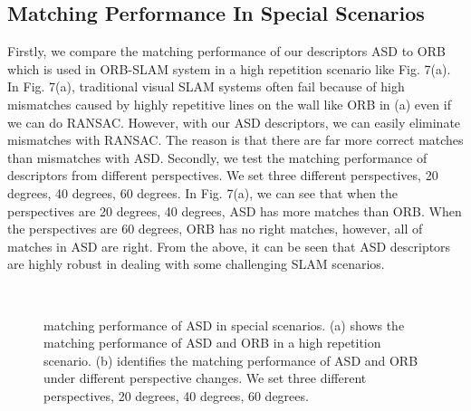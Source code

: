 \documentclass[letterpaper, 10 pt, conference]{ieeeconf}  %
\begin{document}
\subsection{Matching Performance In Special Scenarios}
Firstly, we compare the matching performance of our descriptors ASD to ORB which is used in ORB-SLAM system in a high repetition scenario like Fig. 7(a).  In Fig. 7(a), traditional visual SLAM systems often fail because of high mismatches caused by highly repetitive lines on the wall like ORB in (a) even if we can do RANSAC. However, with our ASD descriptors, we can easily eliminate mismatches with RANSAC. The reason is that there are far more correct matches than mismatches with ASD.
Secondly, we test the matching performance of descriptors from different perspectives. We set three different perspectives, 20 degrees, 40 degrees, 60 degrees. In Fig. 7(a), we can see that when the perspectives are 20 degrees, 40 degrees, ASD has more matches than ORB. When the perspectives are 60 degrees, ORB has no right matches, however, all of matches in ASD are right. From the above, it can be seen that ASD descriptors are highly robust in dealing with some challenging SLAM scenarios.

\begin{figure}[htbp]
\centering
{}%
\\
%

\caption{matching performance of  ASD in special scenarios. (a) shows the matching performance of ASD and ORB in a high repetition scenario. (b) identifies the matching performance of ASD and ORB under different perspective changes. We set three different perspectives, 20 degrees,  40 degrees,  60 degrees.} 
\end{figure}
\end{document}
